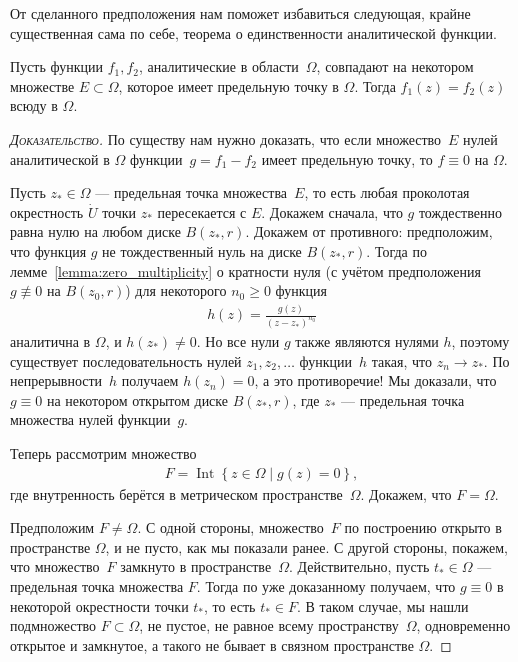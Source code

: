 \documentclass[../complex-analysis.tex]{subfiles}
\begin{document}
От сделанного предположения нам поможет избавиться следующая, крайне существенная сама по себе, теорема о единственности аналитической функции.

\begin{thm}
 \label{theorem:uniqueness}
 Пусть функции $ f_1,f_2 $, аналитические в области~$ \Omega $, совпадают на некотором множестве $ E \subset \Omega $, которое имеет предельную точку в $ \Omega $. Тогда $ f_1(z) = f_2(z) $ всюду в $ \Omega $.
\end{thm}
\begin{proof}[\normalfont\textsc{Доказательство}]
 По существу нам нужно доказать, что если множество~$ E $ нулей аналитической в $ \Omega $ функции~$ g = f_1 - f_2 $ имеет предельную точку, то $ f \equiv 0 $ на $ \Omega $.

 Пусть $ z_\ast \in \Omega $ --- предельная точка множества~$ E $, то есть любая проколотая окрестность $ \dot U $ точки $ z_\ast $ пересекается с $ E $. Докажем сначала, что $ g $ тождественно равна нулю на любом диске $ B(z_\ast,r) $. Докажем от противного: предположим, что функция $ g $ не тождественный нуль на диске $ B(z_\ast, r) $. Тогда по лемме~\ref{lemma:zero_multiplicity} о кратности нуля (с учётом предположения $ g \not\equiv 0 $ на $ B(z_0,r) $) для некоторого $ n_0 \geqslant 0 $ функция
 \begin{align*}
  h(z) = \frac{g(z)}{(z-z_\ast)^{n_0}}
 \end{align*} аналитична в $ \Omega $, и $ h(z_\ast) \neq 0 $. Но все нули $ g $ также являются нулями $ h $, поэтому существует последовательность нулей $ z_1, z_2, \ldots $ функции~$ h $ такая, что $ z_n \to z_\ast $. По непрерывности~$ h $ получаем $ h(z_n) = 0 $, а это противоречие! Мы доказали, что $ g \equiv 0 $ на некотором открытом диске $ B(z_\ast, r) $, где $ z_\ast $ --- предельная точка множества нулей функции~$ g $.

 Теперь рассмотрим множество
 \begin{align*}
  F = \mathop{\mathrm{Int}} \left\{ z \in \Omega \mid g(z) = 0 \right\},
 \end{align*} где внутренность берётся в метрическом пространстве~$ \Omega $. Докажем, что $ F = \Omega $.

 Предположим $ F \neq \Omega $. С одной стороны, множество~$ F $ по построению открыто в пространстве $ \Omega $, и не пусто, как мы показали ранее. С другой стороны, покажем, что множество~$ F $ замкнуто в пространстве~$ \Omega $. Действительно, пусть $ t_\ast \in \Omega $ --- предельная точка множества $ F $. Тогда по уже доказанному получаем, что $ g \equiv 0 $ в некоторой окрестности точки $ t_\ast $, то есть $ t_\ast \in F $. В таком случае, мы нашли подмножество $ F \subset \Omega $, не пустое, не равное всему пространству~$ \Omega $, одновременно открытое и замкнутое, а такого не бывает в связном пространстве $ \Omega $.
\end{proof}
\end{document}
